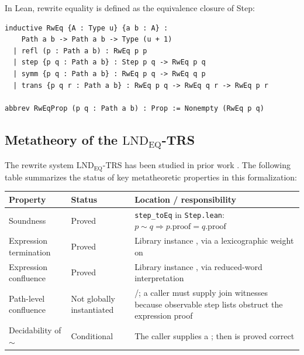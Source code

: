 \documentclass{lmcs}
\theoremstyle{definition}
\theoremstyle{plain}
\theoremstyle{remark}
\newcommand{\RwEq}{\sim}
\begin{document}
In Lean, rewrite equality is defined as the equivalence closure of Step:
\begin{lstlisting}
inductive RwEq {A : Type u} {a b : A} :
    Path a b -> Path a b -> Type (u + 1)
  | refl (p : Path a b) : RwEq p p
  | step {p q : Path a b} : Step p q -> RwEq p q
  | symm {p q : Path a b} : RwEq p q -> RwEq q p
  | trans {p q r : Path a b} : RwEq p q -> RwEq q r -> RwEq p r

abbrev RwEqProp (p q : Path a b) : Prop := Nonempty (RwEq p q)
\end{lstlisting}

\subsection{Metatheory of the \texorpdfstring{$\mathrm{LND}_{\mathrm{EQ}}$}{LND\_EQ}-TRS}
\label{sec:metatheory}

The rewrite system $\mathrm{LND}_{\mathrm{EQ}}$-TRS has been studied in prior work \cite{Ramos2018ExplicitPaths, Ramos2018Thesis, Queiroz2016Paths}. The following table summarizes the status of key metatheoretic properties in this formalization:

\begin{center}
\setlength{\tabcolsep}{4pt}
\begin{tabular}{@{}L{0.22\textwidth}L{0.15\textwidth}L{0.55\textwidth}@{}}
\toprule
\textbf{Property} & \textbf{Status} & \textbf{Location / responsibility} \\
\midrule
Soundness & Proved & \texttt{step\_toEq} in \texttt{Step.lean}: $p \RwEq q \Rightarrow p.\mathrm{proof} = q.\mathrm{proof}$ \\
Expression termination & Proved & Library instance
, via a lexicographic weight on
 \\
Expression confluence & Proved & Library instance
, via reduced-word interpretation \\
Path-level confluence & Not globally instantiated &
/; a caller must supply join
witnesses because observable step lists obstruct the expression proof \\
Decidability of $\RwEq$ & Conditional & The caller supplies a
; then 
is proved correct \\
\bottomrule
\end{tabular}
\end{center}
\end{document}
